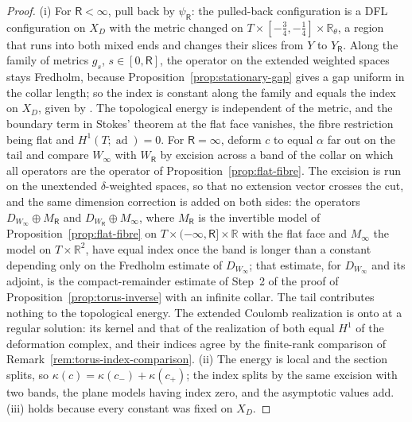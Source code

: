 \documentclass[11pt]{amsart}
\theoremstyle{definition}
\theoremstyle{remark}
\theoremstyle{plain}
\numberwithin{equation}{section}
\newcommand{\RR}{\mathbb{R}}
\newcommand{\ad}{\operatorname{ad}}
\begin{document}
\begin{proof}
(i) For $\mathsf R<\infty$, pull back by $\psi_\mathsf R$: the pulled-back configuration is a DFL
configuration on $X_D$ with the metric changed on $T\times[-\tfrac34,-\tfrac14]\times\RR_\theta$,
a region that runs into both mixed ends and changes their slices from $Y$ to
$Y_\mathsf R$. Along the family of metrics $g_s$, $s\in[0,\mathsf R]$, the operator on the extended weighted spaces stays Fredholm, because Proposition~\ref{prop:stationary-gap} gives a gap
uniform in the collar length; so the index is constant along the family and
equals the index on $X_D$, given by \cite[Proposition~3.20 and Lemma~3.15]{DFL}.
The topological energy is independent of the metric, and the boundary term in
Stokes' theorem at the flat face vanishes, the fibre restriction being flat and
$H^1(T;\ad)=0$.
For $\mathsf R=\infty$, deform $c$ to equal $\alpha$ far out on the tail and compare
$W_\infty$ with $W_\mathsf R$ by excision across a band of the collar on which all
operators are the operator of Proposition~\ref{prop:flat-fibre}. The excision is run on
the unextended $\delta$-weighted spaces, so that no extension vector crosses the cut, and
the same dimension correction is added on both sides: the operators
$D_{W_\infty}\oplus M_\mathsf R$ and $D_{W_\mathsf R}\oplus M_\infty$, where $M_{\mathsf R}$ is the invertible
model of Proposition~\ref{prop:flat-fibre} on $T\times(-\infty,\mathsf R]\times\RR$ with the flat
face and $M_\infty$ the model on $T\times\RR^2$, have equal index
once the band is longer than a constant depending only on the Fredholm
estimate of $D_{W_\infty}$; that estimate, for $D_{W_\infty}$ and its adjoint, is the
compact-remainder estimate of Step~2 of the proof of
Proposition~\ref{prop:torus-inverse} with an infinite collar. The tail contributes nothing to the topological
energy. The extended Coulomb realization is onto at a regular solution: its kernel and that
of the realization of \cite{DFL} both equal $H^1$ of the deformation complex, and their
indices agree by the finite-rank comparison of Remark~\ref{rem:torus-index-comparison}. (ii) The energy is local and the section splits, so
$\kappa(c)=\kappa(c_-)+\kappa(c_+)$; the index splits by the same excision with two
bands, the plane models having index zero, and the asymptotic values add. (iii)
holds because every constant was fixed on $X_D$.
\end{proof}
\end{document}

